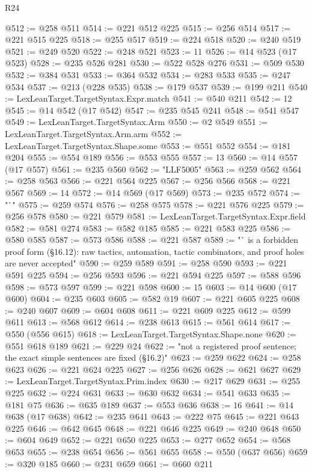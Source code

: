 \begin{lexlean}{R24}
\begin{coremodule}
@512 := @258 @511
@514 := @221 @512 @225
@515 := @256 @514
@517 := @221 @515 @225
@518 := @255 @517
@519 := @224 @518
@520 := @240 @519
@521 := @249 @520
@522 := @248 @521
@523 := 11
@526 := @14 @523 (@17 @523)
@528 := @235 @526 @281
@530 := @522 @528 @276
@531 := @509 @530
@532 := @384 @531
@533 := @364 @532
@534 := @283 @533
@535 := @247 @534
@537 := @213 (@228 @535)
@538 := @179 @537
@539 := @199 @211
@540 := LexLeanTarget.TargetSyntax.Expr.match
@541 := @540 @211
@542 := 12
@545 := @14 @542 (@17 @542)
@547 := @235 @545 @241
@548 := @541 @547
@549 := LexLeanTarget.TargetSyntax.Arm
@550 := @2 @549
@551 := LexLeanTarget.TargetSyntax.Arm.arm
@552 := LexLeanTarget.TargetSyntax.Shape.some
@553 := @551 @552
@554 := @181 @204
@555 := @554 @189
@556 := @553 @555
@557 := 13
@560 := @14 @557 (@17 @557)
@561 := @235 @560
@562 := "LLF5005"
@563 := @259 @562
@564 := @258 @563
@566 := @221 @564 @225
@567 := @256 @566
@568 := @221 @567
@569 := 14
@572 := @14 @569 (@17 @569)
@573 := @235 @572
@574 := "`"
@575 := @259 @574
@576 := @258 @575
@578 := @221 @576 @225
@579 := @256 @578
@580 := @221 @579
@581 := LexLeanTarget.TargetSyntax.Expr.field
@582 := @581 @274
@583 := @582 @185
@585 := @221 @583 @225
@586 := @580 @585
@587 := @573 @586
@588 := @221 @587
@589 := "` is a forbidden proof form (§16.12): raw tactics, automation, tactic combinators, and proof holes are never accepted"
@590 := @259 @589
@591 := @258 @590
@593 := @221 @591 @225
@594 := @256 @593
@596 := @221 @594 @225
@597 := @588 @596
@598 := @573 @597
@599 := @221 @598
@600 := 15
@603 := @14 @600 (@17 @600)
@604 := @235 @603
@605 := @582 @19
@607 := @221 @605 @225
@608 := @240 @607
@609 := @604 @608
@611 := @221 @609 @225
@612 := @599 @611
@613 := @568 @612
@614 := @238 @613
@615 := @561 @614
@617 := @550 (@556 @615)
@618 := LexLeanTarget.TargetSyntax.Shape.none
@620 := @551 @618 @189
@621 := @229 @24
@622 := "not a registered proof sentence; the exact simple sentences are fixed (§16.2)"
@623 := @259 @622
@624 := @258 @623
@626 := @221 @624 @225
@627 := @256 @626
@628 := @621 @627
@629 := LexLeanTarget.TargetSyntax.Prim.index
@630 := @217 @629
@631 := @255 @225
@632 := @224 @631
@633 := @630 @632
@634 := @541 @633
@635 := @181 @75
@636 := @635 @189
@637 := @553 @636
@638 := 16
@641 := @14 @638 (@17 @638)
@642 := @235 @641
@643 := @222 @75
@645 := @221 @643 @225
@646 := @642 @645
@648 := @221 @646 @225
@649 := @240 @648
@650 := @604 @649
@652 := @221 @650 @225
@653 := @277 @652
@654 := @568 @653
@655 := @238 @654
@656 := @561 @655
@658 := @550 (@637 @656)
@659 := @320 @185
@660 := @231 @659
@661 := @660 @211

\end{coremodule}
\end{lexlean}
